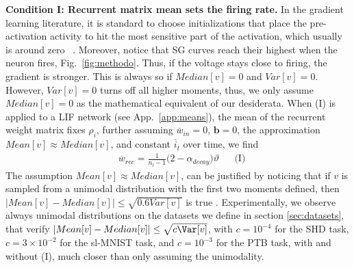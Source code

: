\noindent\textbf{Condition I: Recurrent matrix mean sets the firing rate.}
In the gradient learning literature, it is standard to choose initializations that place the pre-activation activity 
to hit the most sensitive part of the activation, which usually is around zero 
~\cite{glorot2010understanding, he2015delving, roberts2022principles, Hanin2018HowTS, ioffe2015batch, ba2016layer}.
Moreover, notice that SG curves reach their highest when the neuron fires, Fig.~\ref{fig:methodo}. Thus, if the voltage stays close to firing, the gradient is stronger. This is always so if $Median[v]=0$ and $Var[v]=0$. However, $Var[v]=0$  turns off all higher moments, thus, we only assume $Median[v]=0$ as the mathematical equivalent of our desiderata. When (I) is applied to a LIF network (see App.~\ref{app:means}), the mean of the recurrent weight matrix fixes $\rho_i$, further assuming $\overline{w}_{in}=0$,  $\boldsymbol{b}=0$, the approximation $Mean[v]\approx Median[v]$, and constant $\overline{i}_t$ over time, we find
{\small
\begin{align*}
    &\overline{w}_{rec}=
    \frac{1}{n_{l}-1}\Big(2-\alpha_{decay}\Big)\vartheta && \text{(I)}
\end{align*}
}
The assumption $Mean[v]\approx Median[v]$, can be justified by noticing that if $v$ is sampled from a unimodal distribution with the first two moments defined, then $|Mean[v]-Median[v]|\leq\sqrt{0.6Var[v]}$ is true \cite{basu1997mean}. Experimentally, we observe always unimodal distributions on the datasets we define in section \ref{sec:datasets}, that verify $|Mean[v]-Median[v]|\leq\sqrt{c\Var[v]}$, with $c=10^{-4}$ for the SHD task, $c=3\times10^{-2}$ for the sl-MNIST task, and $c=10^{-3}$ for the PTB task, with and without (I), much closer than only assuming the unimodality.

